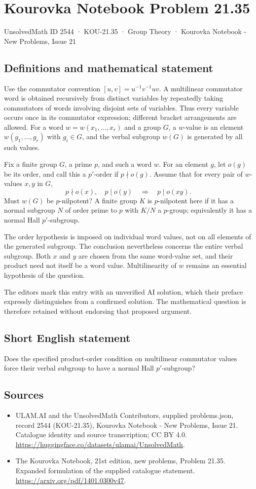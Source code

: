 \documentclass[11pt,a4paper]{article}
\begin{document}
\section*{Kourovka Notebook Problem 21.35}\label{2544}
{\small UnsolvedMath ID 2544 · KOU-21.35 · Group Theory · Kourovka Notebook - New Problems, Issue 21}
\subsection{Definitions and mathematical statement}
Use the commutator convention $[u,v]=u^{-1}v^{-1}uv$.
A multilinear commutator word is obtained recursively from distinct
variables by repeatedly taking commutators of words involving disjoint
sets of variables. Thus every variable occurs once in its commutator
expression; different bracket arrangements are allowed.
For a word $w=w(x_1,\ldots,x_r)$ and a group $G$, a $w$-value is an
element $w(g_1,\ldots,g_r)$ with $g_i\in G$, and the verbal subgroup
$w(G)$ is generated by all such values.

Fix a finite group $G$, a prime $p$, and such a word $w$. For an element
$g$, let $o(g)$ be its order, and call this a $p'$-order if $p\nmid o(g)$.
Assume that for every pair of $w$-values $x,y$ in $G$,
\[
 p\nmid o(x),\quad p\mid o(y)\quad\Longrightarrow\quad p\mid o(xy).
\]
Must $w(G)$ be $p$-nilpotent? A finite group $K$ is $p$-nilpotent here
if it has a normal subgroup $N$ of order prime to $p$ with $K/N$ a
$p$-group; equivalently it has a normal Hall $p'$-subgroup.

The order hypothesis is imposed on individual word values, not on all
elements of the generated subgroup. The conclusion nevertheless concerns
the entire verbal subgroup. Both $x$ and $y$ are chosen from the same
word-value set, and their product need not itself be a word value.
Multilinearity of $w$ remains an essential hypothesis of the question.

The editors mark this entry with an unverified AI solution, which their
preface expressly distinguishes from a confirmed solution. The mathematical
question is therefore retained without endorsing that proposed argument.
\subsection{Short English statement}
Does the specified product-order condition on multilinear commutator values force their verbal subgroup to have a normal Hall $p'$-subgroup?
\subsection{Sources}
\begin{itemize}
\item[S1] ULAM.AI and the UnsolvedMath Contributors, supplied problems.json, record 2544 (KOU-21.35), Kourovka Notebook - New Problems, Issue 21. Catalogue identity and source transcription; CC BY 4.0.
\url{https://huggingface.co/datasets/ulamai/UnsolvedMath}.
\item[S2] The Kourovka Notebook, 21st edition, new problems, Problem 21.35. Expanded formulation of the supplied catalogue statement.
\url{https://arxiv.org/pdf/1401.0300v47}.
\end{itemize}
\end{document}
